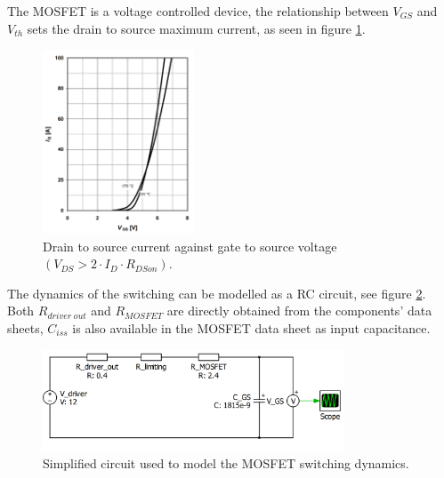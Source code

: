 The MOSFET is a voltage controlled device, the relationship between $V_{GS}$ and $V_{th}$ sets the drain to source maximum current, as seen in figure \ref{ids_vgs}.

\begin{figure}[htbp]
	\begin{center}
		\includegraphics[width=0.4\textwidth]{../Pictures/P1/Component_sizing/ids_against_vgs.png}
		\caption{Drain to source current against gate to source voltage $(V_{DS} > 2 \cdot I_{D}\cdot R_{DSon}) $.}
		\label{ids_vgs}
	\end{center}
\end{figure}

The dynamics of the switching can be modelled as a RC circuit, see figure \ref{mosfet_rc_gate}. Both $R_{driver \; out}$ and $R_{MOSFET}$ are directly obtained from the components' data sheets, $C_{iss}$ is also available in the MOSFET data sheet as input capacitance.



\begin{figure}[H]
	\begin{center}
		\includegraphics[width=0.8\textwidth]{../Pictures/P1/Component_sizing/driver_resistor_sizing.png}
		\caption{Simplified circuit used to model the MOSFET switching dynamics.}
		\label{mosfet_rc_gate}
	\end{center}	
\end{figure}

